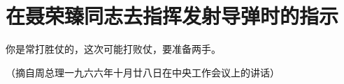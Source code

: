 \section[在聂荣臻同志去指挥发射导弹时的指示（一九六六年十月二十七日）]{在聂荣臻同志去指挥发射导弹时的指示}


你是常打胜仗的，这次可能打败仗，要准备两手。

{\raggedleft （摘自周总理一九六六年十月廿八日在中央工作会议上的讲话）\par}


